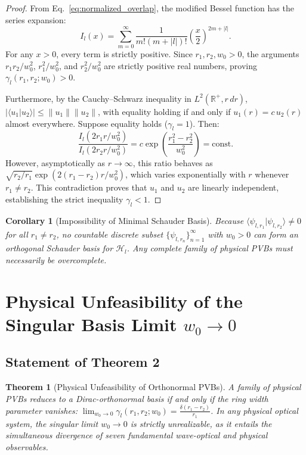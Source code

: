 \documentclass[11pt,a4paper]{article}
\newtheorem{theorem}{Theorem}
\newtheorem{corollary}{Corollary}
\begin{document}
\begin{proof}
From Eq.~\eqref{eq:normalized_overlap}, the modified Bessel function has the series expansion:
\begin{equation}
I_l(x) = \sum_{m=0}^\infty \frac{1}{m! (m + |l|)!} \left( \frac{x}{2} \right)^{2m + |l|}.
\end{equation}
For any $x > 0$, every term is strictly positive. Since $r_1, r_2, w_0 > 0$, the arguments $r_1 r_2 / w_0^2$, $r_1^2 / w_0^2$, and $r_2^2 / w_0^2$ are strictly positive real numbers, proving $\gamma_l(r_1, r_2; w_0) > 0$.

Furthermore, by the Cauchy--Schwarz inequality in $L^2(\mathbb{R}^+, r \, dr)$, $|\langle u_1 | u_2 \rangle| \le \|u_1\| \|u_2\|$, with equality holding if and only if $u_1(r) = c \, u_2(r)$ almost everywhere. Suppose equality holds ($\gamma_l = 1$). Then:
\begin{equation}
\frac{I_l(2 r_1 r / w_0^2)}{I_l(2 r_2 r / w_0^2)} = c \exp\left( \frac{r_1^2 - r_2^2}{w_0^2} \right) = \text{const}.
\end{equation}
However, asymptotically as $r \to \infty$, this ratio behaves as $\sqrt{r_2 / r_1} \exp(2(r_1 - r_2)r / w_0^2)$, which varies exponentially with $r$ whenever $r_1 \neq r_2$. This contradiction proves that $u_1$ and $u_2$ are linearly independent, establishing the strict inequality $\gamma_l < 1$.
\end{proof}

\begin{corollary}[Impossibility of Minimal Schauder Basis]
Because $\langle \psi_{l, r_1} | \psi_{l, r_2} \rangle \neq 0$ for all $r_1 \neq r_2$, no countable discrete subset $\{\psi_{l, r_n}\}_{n=1}^\infty$ with $w_0 > 0$ can form an orthogonal Schauder basis for $\mathcal{H}_l$. Any complete family of physical PVBs must necessarily be overcomplete.
\end{corollary}

\section{Physical Unfeasibility of the Singular Basis Limit $w_0 \to 0$}
\label{sec:unfeasibility}

\subsection{Statement of Theorem 2}

\begin{theorem}[Physical Unfeasibility of Orthonormal PVBs]
A family of physical PVBs reduces to a Dirac-orthonormal basis if and only if the ring width parameter vanishes: $\lim_{w_0 \to 0} \gamma_l(r_1, r_2; w_0) = \frac{\delta(r_1 - r_2)}{r_1}$. In any physical optical system, the singular limit $w_0 \to 0$ is strictly unrealizable, as it entails the simultaneous divergence of seven fundamental wave-optical and physical observables.
\end{theorem}
\end{document}
